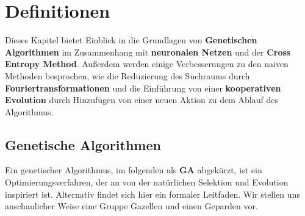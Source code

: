 
\chapter{Definitionen}


Dieses Kapitel bietet Einblick in die Grundlagen von \textbf{Genetischen Algorithmen} im Zusammenhang mit \textbf{neuronalen Netzen} und der \textbf{Cross Entropy Method}. Außerdem werden einige Verbesserungen zu den naiven Methoden besprochen, wie die Reduzierung des Suchraums durch \textbf{Fouriertransformationen} und die Einführung von einer \textbf{kooperativen Evolution} durch Hinzufügen von einer neuen Aktion zu dem Ablauf des Algorithmus.

    \section{Genetische Algorithmen}


        Ein genetischer Algorithmus, im folgenden als \textbf{GA} abgekürzt, ist ein Optimierungsverfahren, der an von der natürlichen Selektion und Evolution inspiriert ist. Alternativ findet sich hier\cite{ga} ein formaler Leitfaden. Wir stellen uns anschaulicher Weise eine Gruppe Gazellen und einen Geparden vor.\\

